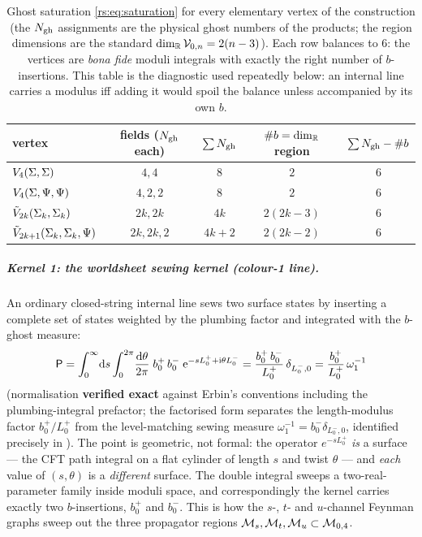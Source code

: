 \begin{table}[htp]
	\centering
	\begin{tabular}{lcccc}
		\toprule
		vertex & fields ($N_{\text{gh}}$ each) & $\sum N_{\text{gh}}$ & $\#b = \dim_{\mathbb{R}}$ region & $\sum N_{\text{gh}}-\#b$ \\
		\midrule
		$V_4(\Sigma,\Sigma)$ & $4,4$ & $8$ & $2$ & $6$ \\
		$V_4(\Sigma,\Psi,\Psi)$ & $4,2,2$ & $8$ & $2$ & $6$ \\
		$\tilde V_{2k}(\Sigma_k,\Sigma_k)$ & $2k,2k$ & $4k$ & $2(2k-3)$ & $6$ \\
		$\tilde V_{2k+1}(\Sigma_k,\Sigma_k,\Psi)$ & $2k,2k,2$ & $4k+2$ & $2(2k-2)$ & $6$ \\
		\bottomrule
	\end{tabular}
	\caption{Ghost saturation \eqref{rs:eq:saturation} for every elementary vertex of
	the construction (the $N_{\text{gh}}$ assignments are the physical ghost numbers of the products; the region
	dimensions are the standard $\dim_{\mathbb{R}}{\mathcal{V}}_{0,n}=2(n-3)$). Each row balances to
	$6$: the vertices are \emph{bona fide} moduli integrals with exactly the right
	number of $b$-insertions. This table is the diagnostic used repeatedly below:
	an internal line carries a modulus iff adding it would spoil the balance unless
	accompanied by its own $b$.}
	\label{rs:tab:saturation}
\end{table}

\subparagraph{Kernel 1: the worldsheet sewing kernel (colour-1 line).} An ordinary
closed-string internal line sews two surface states by inserting a complete set
of states weighted by the plumbing factor and integrated with the $b$-ghost
measure:
\begin{equation}
	\mathsf P
	= \int_0^\infty\!\mathrm{d} s\int_0^{2\pi}\!\frac{\mathrm{d}\theta}{2\pi}\;
	b_0^+\,b_0^-\;\mathrm{e}^{-sL_0^+ + \mathrm{i}\theta L_0^-}
	= \frac{b_0^+\,b_0^-}{L_0^+}\,\delta_{L_0^-,0}
	= \frac{b_0^+}{L_0^+}\,\omega_1^{-1}
	\label{rs:eq:sewing}
\end{equation}
(normalisation \textbf{verified exact} against Erbin's conventions \cite{Erbin:2021:StringFieldTheory}
including the plumbing-integral prefactor; the
factorised form separates the length-modulus factor $b_0^+/L_0^+$ from the
level-matching sewing measure $\omega_1^{-1}=b_0^-\delta_{L_0^-,0}$, identified
precisely in ). The point is geometric, not formal: the operator
$e^{-sL_0^+}$ \emph{is} a surface --- the CFT path integral on a flat cylinder of
length $s$ and twist $\theta$ --- and \emph{each} value of $(s,\theta)$ is a
\emph{different} surface. The double integral sweeps a two-real-parameter family
inside moduli space, and correspondingly the kernel carries exactly two
$b$-insertions, $b_0^+$ and $b_0^-$. This is how the $s$-, $t$- and $u$-channel
Feynman graphs sweep out the three propagator regions
${\mathcal{M}}_s,{\mathcal{M}}_t,{\mathcal{M}}_u\subset{\mathcal{M}}_{0,4}$.

